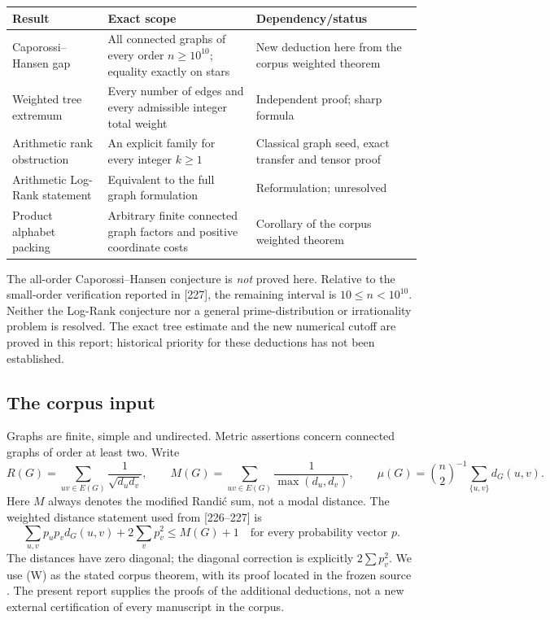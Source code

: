 \documentclass[11pt,a4paper]{article}
\theoremstyle{definition}
\theoremstyle{remark}
\numberwithin{equation}{section}
\begin{document}
\begin{center}
\small
\begin{tabularx}{\linewidth}{@{}>{\raggedright\arraybackslash}p{.27\linewidth}X>{\raggedright\arraybackslash}p{.24\linewidth}@{}}
\toprule
Result & Exact scope & Dependency/status\\
\midrule
Caporossi--Hansen gap &
All connected graphs of every order $n\ge10^{10}$;
equality exactly on stars &
New deduction here from the corpus weighted theorem\\
Weighted tree extremum &
Every number of edges and every admissible integer total weight &
Independent proof; sharp formula\\
Arithmetic rank obstruction &
An explicit family for every integer $k\ge1$ &
Classical graph seed, exact transfer and tensor proof\\
Arithmetic Log-Rank statement &
Equivalent to the full graph formulation &
Reformulation; unresolved\\
Product alphabet packing &
Arbitrary finite connected graph factors and positive coordinate costs &
Corollary of the corpus weighted theorem\\
\bottomrule
\end{tabularx}
\end{center}

The all-order Caporossi--Hansen conjecture is \emph{not} proved here.
Relative to the small-order verification reported in [227], the
remaining interval is $10\le n<10^{10}$. Neither the Log-Rank conjecture
nor a general prime-distribution or irrationality problem is resolved.
The exact tree estimate and the new numerical cutoff are proved in this
report; historical priority for these deductions has not been established.

\subsection{The corpus input}

Graphs are finite, simple and undirected. Metric assertions concern
connected graphs of order at least two. Write
\[
R(G)=\sum_{uv\in E(G)}\frac1{\sqrt{d_ud_v}},\qquad
M(G)=\sum_{uv\in E(G)}\frac1{\max(d_u,d_v)},\qquad
\mu(G)=\binom n2^{-1}\sum_{\{u,v\}}d_G(u,v).
\]
Here $M$ always denotes the modified Randi\'c sum, not a modal distance.
The weighted distance statement used from [226--227] is
\begin{equation}
 \sum_{u,v}p_up_vd_G(u,v)+2\sum_vp_v^2\le M(G)+1
 \quad\text{for every probability vector }p.
 \tag{W}\label{eq:W}
\end{equation}
The distances have zero diagonal; the diagonal correction is explicitly
$2\sum p_v^2$. We use (W) as the stated corpus theorem, with its proof
located in the frozen source \cite{vmrc227}. The present report supplies
the proofs of the additional deductions, not a new external
certification of every manuscript in the corpus.
\end{document}
